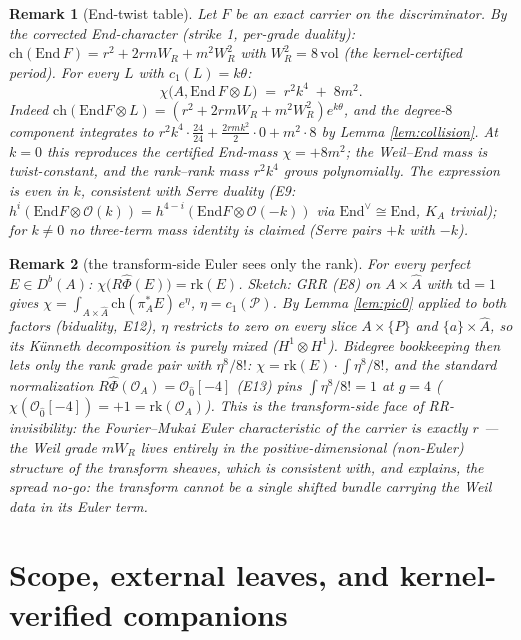 \documentclass[11pt]{article}
\newtheorem{remark}{Remark}
\begin{document}
\begin{remark}[End-twist table]\label{rem:endtwist}
Let $F$ be an exact carrier on the discriminator. By the corrected End-character (strike 1, per-grade
duality): $\mathrm{ch}(\mathrm{End}\,F)=r^2+2rmW_R+m^2W_R^2$ with $W_R^2=8\,\mathrm{vol}$ (the
kernel-certified period). For every $L$ with $c_1(L)=k\theta$:
\[
\chi\big(A,\mathrm{End}\,F\otimes L\big)\;=\;r^2k^4\;+\;8m^2 .
\]
Indeed $\mathrm{ch}(\mathrm{End}F\otimes L)=(r^2+2rmW_R+m^2W_R^2)e^{k\theta}$, and the degree-$8$
component integrates to $r^2k^4\cdot\tfrac{24}{24}+\tfrac{2rmk^2}{2}\cdot0+m^2\cdot8$ by Lemma
\ref{lem:collision}. At $k=0$ this reproduces the certified End-mass $\chi=+8m^2$; the Weil--End mass
is \emph{twist-constant}, and the rank--rank mass $r^2k^4$ grows polynomially. The expression is even in
$k$, consistent with Serre duality (E9: $h^i(\mathrm{End}F\otimes\mathcal{O}(k))=
h^{4-i}(\mathrm{End}F\otimes\mathcal{O}(-k))$ via $\mathrm{End}^\vee\cong\mathrm{End}$, $K_A$ trivial);
for $k\ne0$ no three-term mass identity is claimed (Serre pairs $+k$ with $-k$).
\end{remark}

\begin{remark}[the transform-side Euler sees only the rank]\label{rem:fmeuler}
For every perfect $E\in D^b(A)$: $\chi\big(R\widehat\Phi(E)\big)=\mathrm{rk}(E)$. Sketch: GRR (E8) on
$A\times\hat A$ with $\mathrm{td}=1$ gives
$\chi=\int_{A\times\hat A}\mathrm{ch}(\pi_A^\ast E)\,e^{\eta}$, $\eta=c_1(\mathcal{P})$. By Lemma
\ref{lem:pic0} applied to both factors (biduality, E12), $\eta$ restricts to zero on every slice
$A\times\{P\}$ and $\{a\}\times\hat A$, so its K\"unneth decomposition is purely mixed
($H^1\otimes H^1$). Bidegree bookkeeping then lets only the rank grade pair with $\eta^8/8!$:
$\chi=\mathrm{rk}(E)\cdot\int\eta^8/8!$, and the standard normalization
$R\widehat\Phi(\mathcal{O}_A)=\mathcal{O}_{\hat0}[-4]$ (E13) pins $\int\eta^8/8!=1$ at $g=4$
($\chi(\mathcal{O}_{\hat0}[-4])=+1=\mathrm{rk}(\mathcal{O}_A)$). This is the transform-side face of
RR-invisibility: the Fourier--Mukai Euler characteristic of the carrier is exactly $r$ --- the Weil
grade $mW_R$ lives entirely in the positive-dimensional (non-Euler) structure of the transform sheaves,
which is consistent with, and explains, the spread no-go: the transform cannot be a single shifted
bundle carrying the Weil data in its Euler term.
\end{remark}

\section{Scope, external leaves, and kernel-verified companions}\label{sec:scope}
\end{document}
